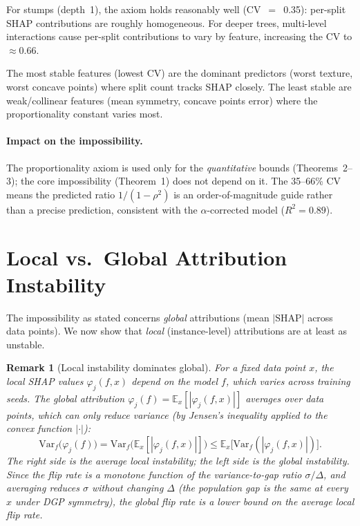 \documentclass{article}
\newcommand{\Var}{\mathrm{Var}}
\newtheorem{remark}[theorem]{Remark}
\begin{document}
For stumps (depth~1), the axiom holds reasonably well (CV~$=$~0.35):
per-split SHAP contributions are roughly homogeneous. For deeper
trees, multi-level interactions cause per-split contributions to vary
by feature, increasing the CV to ${\approx}0.66$.

The most stable features (lowest CV) are the dominant predictors
(worst texture, worst concave points) where split count tracks SHAP
closely. The least stable are weak/collinear features (mean symmetry,
concave points error) where the proportionality constant varies most.

\paragraph{Impact on the impossibility.}
The proportionality axiom is used only for the \emph{quantitative}
bounds (Theorems~2--3); the core impossibility (Theorem~1) does not
depend on it. The 35--66\% CV means the predicted ratio $1/(1{-}\rho^2)$
is an order-of-magnitude guide rather than a precise prediction,
consistent with the $\alpha$-corrected model ($R^2 = 0.89$).


\section{Local vs.\ Global Attribution Instability}

The impossibility as stated concerns \emph{global} attributions
(mean $|\text{SHAP}|$ across data points). We now show that
\emph{local} (instance-level) attributions are at least as unstable.

\begin{remark}[Local instability dominates global]
\label{rem:local-instability}
For a fixed data point $x$, the local SHAP values
$\varphi_j(f, x)$ depend on the model $f$, which varies across
training seeds. The global attribution
$\varphi_j(f) = \mathbb{E}_x[|\varphi_j(f, x)|]$ averages over
data points, which can only reduce variance (by Jensen's inequality
applied to the convex function $|\cdot|$):
\[
    \Var_f\!\big(\varphi_j(f)\big)
    = \Var_f\!\big(\mathbb{E}_x[|\varphi_j(f,x)|]\big)
    \leq \mathbb{E}_x\!\big[\Var_f(|\varphi_j(f,x)|)\big].
\]
The right side is the average local instability; the left side is the
global instability. Since the flip rate is a monotone function of
the variance-to-gap ratio $\sigma/\Delta$, and averaging reduces
$\sigma$ without changing $\Delta$ (the population gap is the same
at every $x$ under DGP symmetry), the global flip rate is a lower
bound on the average local flip rate.
\end{remark}
\end{document}
